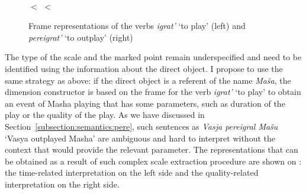 \begin{figure}\small
\begin{minipage}{0.3\textwidth}
\end{minipage}\hfill%
\begin{minipage}{0.65\textwidth}\centering
{}\\
 $<$  $<$ 
\end{minipage}
\caption{Frame representations of the verbs \textit{igrat'} `to play' (left) and \textit{pereigrat'} `to outplay' (right) \label{frame:outplay}}
\end{figure}

The type of the scale and the marked point remain underspecified and need to be identified using the information about the direct object. I propose to use the same strategy as above: if the direct object is a referent of the name \textit{Ma\v{s}a}, the dimension constructor is based on the frame for the verb \textit{igrat'} `to play' to obtain an event of Masha playing that has some parameters, such as duration of the play or the quality of the play. As we have discussed in Section~\ref{subsection:semantics:pere}, such sentences as \textit{Vasja pereigral Ma\v{s}u} `Vasya outplayed Masha' are ambiguous and hard to interpret without the context that would provide the relevant parameter. The representations that can be obtained as a result of such complex scale extraction procedure are shown on : the time-related interpretation on the left side and the quality-related interpretation on the right side.

